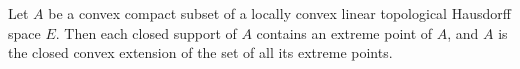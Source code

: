 Let $A$ be a convex compact subset of a locally convex linear topological Hausdorff space $E$. Then each closed support of $A$ contains an extreme point of $A$, and $A$ is the closed convex extension of the set of all its extreme points.
